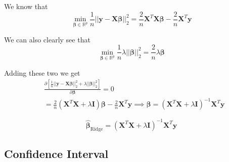 \documentclass[twoside,11pt]{report}
\begin{document}
We know that 
$$
{\displaystyle \min_{\mathbf{\beta}\in
{\mathbb{R}}^{p}}}\frac{1}{n} \vert\vert\mathbf{y}- \mathbf{X}\boldsymbol{\beta}\vert\vert_2^2 = \frac{2}{n} \mathbf{X}^T\mathbf{X}\boldsymbol{\beta}-\frac{2}{n}\mathbf{X}^T\mathbf{y}
$$

We can also clearly see that
$${\displaystyle \min_{\mathbf{\beta}\in
{\mathbb{R}}^{p}}}\frac{1}{n} \lambda \vert\vert \mathbf{\beta}\vert\vert_2^2 = \frac{2}{n} \lambda \mathbf{\beta}
$$

Adding these two we get
\begin{align*}
   & \frac{\partial \left[\frac{1}{n}\vert\vert \mathbf{y}-\mathbf{X}\boldsymbol{\beta}\vert\vert_2^2+\lambda\vert\vert \boldsymbol{\beta}\vert\vert_2^2\right]}
    {\partial{\mathbf{\beta}}} = 0\\
                               &= \frac{2}{n}\left(\mathbf{X}^T\mathbf{X}+\lambda\mathbf{I}\right)
                               \boldsymbol{\beta}-\frac{2}{n}\mathbf{X}^T\mathbf{y} \implies \boldsymbol{\beta} = \left(\mathbf{X}^T\mathbf{X}+\lambda\mathbf{I}\right)^{-1}\mathbf{X}^T\mathbf{y}
\end{align*}



$$
\hat{\boldsymbol{\beta}}_{\mathrm{Ridge}} = \left(\mathbf{X}^T\mathbf{X}+\lambda\mathbf{I}\right)^{-1}\mathbf{X}^T\mathbf{y}
$$








%
\subsection*{Confidence Interval}
\makeatletter{}\makeatother
\label{app:confidenceinterval}
\end{document}
